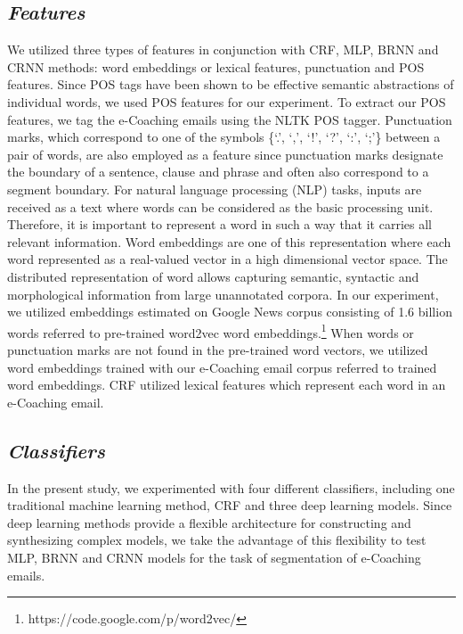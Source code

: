 \documentclass{amia}
\begin{document}
\subsection*{\textit{Features}}

We utilized three types of features in conjunction with CRF, MLP, BRNN and CRNN methods: word embeddings or lexical features, punctuation and POS features. Since POS tags have been shown to be effective semantic abstractions of individual words, we used POS features for our experiment.\cite{liu2005using,treviso2017sentence} To extract our POS features, we tag the e-Coaching emails using the NLTK POS tagger. Punctuation marks, which correspond to one of the symbols \{`.', `,', `!', `?', `:', `;'\} between a pair of words, are also employed as a feature since punctuation marks designate the boundary of a sentence, clause and phrase and often also correspond to a segment boundary.\cite{cho2002text} For natural language processing (NLP) tasks, inputs are received as a text where words can be considered as the basic processing unit. Therefore, it is important to represent a word in such a way that it carries all relevant information. Word embeddings are one of this representation where each word represented as a real-valued vector in a high dimensional vector space. The distributed representation of word allows capturing semantic, syntactic and morphological information from large unannotated corpora.\cite{pennington2014glove, mikolov2013distributed} In our experiment, we utilized embeddings estimated on Google News corpus consisting of 1.6 billion words referred to pre-trained word2vec word embeddings.\footnote{https://code.google.com/p/word2vec/} When words or punctuation marks are not found in the pre-trained word vectors, we utilized word embeddings trained with our e-Coaching email corpus referred to trained word embeddings. CRF utilized lexical features which represent each word in an e-Coaching email. 

\subsection*{\textit{Classifiers}}

In the present study, we experimented with four different classifiers, including one traditional machine learning method, CRF and three deep learning models. Since deep learning methods provide a flexible architecture for constructing and synthesizing complex models, we take the advantage of this flexibility to test MLP, BRNN and CRNN models for the task of segmentation of e-Coaching emails.
\end{document}
